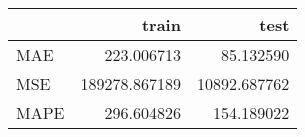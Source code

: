 \begin{tabular}{lrr}
\toprule
{} &          train &          test \\
\midrule
MAE  &     223.006713 &     85.132590 \\
MSE  &  189278.867189 &  10892.687762 \\
MAPE &     296.604826 &    154.189022 \\
\bottomrule
\end{tabular}
